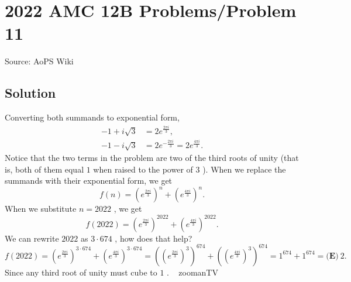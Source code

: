\documentclass[12pt]{article}
\begin{document}
\section*{{2022 AMC 12B Problems/Problem 11}}
Source: AoPS Wiki

\subsection*{Solution}
Converting both summands to exponential form, \begin{align*} -1 + i\sqrt{3} &= 2e^{\frac{2\pi i}{3}}, \\ -1 - i\sqrt{3} &= 2e^{-\frac{2\pi i}{3}} = 2e^{\frac{4\pi i}{3}}. \end{align*} Notice that the two terms in the problem are two of the third roots of unity (that is, both of them equal $1$ when raised to the power of $3$ ).
When we replace the summands with their exponential form, we get \[f(n) = \left(e^{\frac{2\pi i}{3}}\right)^n + \left(e^{\frac{4\pi i}{3}}\right)^n.\] When we substitute $n = 2022$ , we get \[f(2022) = \left(e^{\frac{2\pi i}{3}}\right)^{2022} + \left(e^{\frac{4\pi i}{3}}\right)^{2022}.\] We can rewrite $2022$ as $3 \cdot 674$ , how does that help? \[f(2022) = \left(e^{\frac{2\pi i}{3}}\right)^{3 \cdot 674} + \left(e^{\frac{4\pi i}{3}}\right)^{3 \cdot 674} = \left(\left(e^{\frac{2\pi i}{3}}\right)^{3}\right)^{674} + \left(\left(e^{\frac{4\pi i}{3}}\right)^{3}\right)^{674} = 1^{674} + 1^{674} = \boxed{\textbf{(E)} \ 2}.\] Since any third root of unity must cube to $1$ . ~ zoomanTV
\end{document}
